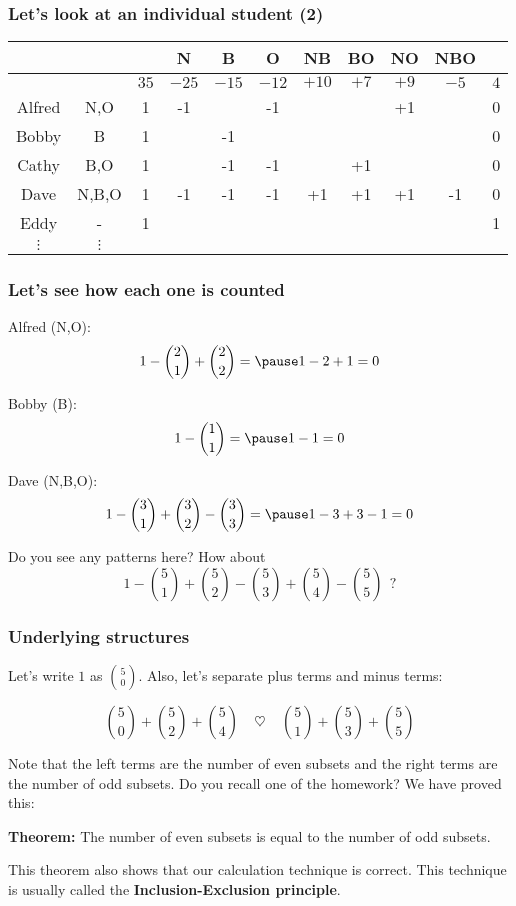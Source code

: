 \begin{frame}\frametitle{Let's look at an individual student (2)}
  {\small
  \begin{tabular}{c|c||c|c|c|c|c|c|c|c||c}
    & &  & N & B & O & NB & BO & NO & NBO & \\
    \hline
    & & $35$ & $-25$ & $-15$ & $-12$ & $+10$ & $+7$ & $+9$ & $-5$ & $4$ \\
    \hline
    Alfred & N,O & 1 & -1 & & -1 & & & +1 & & 0 \\
    Bobby & B & 1 & & -1 & & & & & & 0 \\
    Cathy & B,O & 1 & & -1 & -1 & & +1 & & & 0 \\
    Dave & N,B,O & 1 & -1 & -1 & -1 & +1 & +1 & +1 & -1 & 0 \\
    Eddy & - & 1 & &  & & & & & & 1 \\
    $\vdots$ & $\vdots$ & & & & & & & & & \\
  \end{tabular}
  }
\end{frame}

\begin{frame}\frametitle{Let's see how each one is counted}
  Alfred (N,O): \pause $$1 - {2\choose 1} + {2\choose 2} = \pause 1 - 2 + 1 = 0$$

  Bobby (B): \pause $$1 - {1\choose 1} = \pause 1 - 1 = 0$$

  Dave (N,B,O): \pause $$1 - {3\choose 1} + {3\choose 2} - {3\choose 3} = \pause 1 - 3 + 3 - 1 = 0$$

  \pause

  Do you see any patterns here?
  \pause
  How about $$1 - {5\choose 1} + {5\choose 2} - {5\choose 3} + {5\choose 4} - {5\choose 5}\ \ ?$$
\end{frame}

\begin{frame}\frametitle{Underlying structures}
  Let's write $1$ as ${5\choose 0}$.  Also, let's separate plus terms
  and minus terms:

  $${5\choose 0} + {5\choose 2} + {5\choose 4}
  \ \ \ \ \ \heartsuit \ \ \ \ \
  {5\choose 1} + {5\choose 3} + {5\choose 5}$$

  \pause
  \vspace{0.1in}
  Note that the left terms are the number of even subsets and the
  right terms are the number of odd subsets.  Do you recall one of the
  homework? \pause We have proved this:

  \begin{tcolorbox}
    {\bf Theorem:} The number of even subsets is equal to the number
    of odd subsets.
  \end{tcolorbox}

  This theorem also shows that our calculation technique is correct.
  This technique is usually called the {\bf Inclusion-Exclusion
    principle}.
\end{frame}

